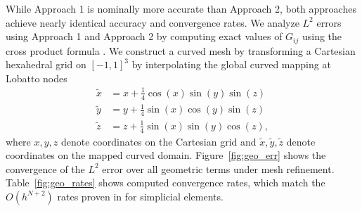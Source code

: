 \documentclass{svjour3}                     %
\renewcommand{\tilde}{\widetilde}
\begin{document}
While Approach 1 is nominally more accurate than Approach 2, both approaches achieve nearly identical accuracy and convergence rates.  We analyze $L^2$ errors using Approach 1 and Approach 2 by  computing exact values of $G_{ij}$ using the cross product formula \cite{kopriva2006metric, hesthaven2007nodal}.   We construct a curved mesh by transforming a Cartesian hexahedral grid on $[-1,1]^3$ by interpolating the global curved mapping at Lobatto nodes
\begin{align*}
    \tilde{x} &= x + \frac{1}{4}\cos(x)\sin(y)\sin(z)\\
    \tilde{y} &= y + \frac{1}{4}\sin(x)\cos(y)\sin(z)\\
    \tilde{z} &= z + \frac{1}{4}\sin(x)\sin(y)\cos(z),
\end{align*}
where $x,y,z$ denote coordinates on the Cartesian grid and $\tilde{x},\tilde{y},\tilde{z}$ denote coordinates on the mapped curved domain.  Figure~\ref{fig:geo_err} shows the convergence of the $L^2$ error over all geometric terms under mesh refinement.  Table~\ref{fig:geo_rates} shows computed convergence rates, which match the $O(h^{N+2})$ rates proven in \cite{chan2018discretely, crean2018entropy} for simplicial elements.
\end{document}
